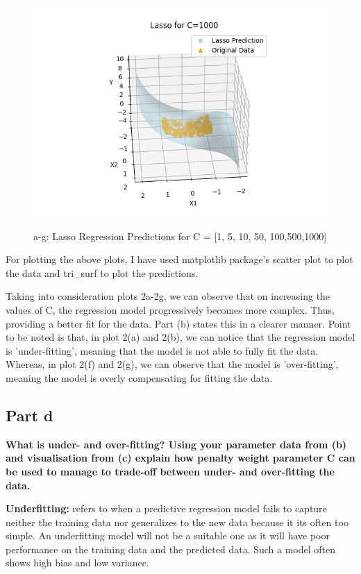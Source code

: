 \documentclass[10pt]{article}
\begin{document}
\begin{figure}[H]
\begin{center}
    \includegraphics[scale=0.4]{./images/Figure_2_1000.png}
    \caption{a-g: Lasso Regression Predictions for C = [1, 5, 10, 50, 100,500,1000]}
  \end{center}
\end{figure}
For plotting the above plots, I have used matplotlib package's scatter plot to plot the data and tri\_surf to plot the predictions.

Taking into consideration plots 2a-2g, we can observe that on increasing the values of C, the regression model progressively becomes more complex. Thus, providing a better fit for the data. Part (b) states this in a clearer manner. Point to be noted is that, in plot 2(a) and 2(b), we can notice that the regression model is 'under-fitting', meaning that the model is not able to fully fit the data. Whereas, in plot 2(f) and 2(g), we can observe that the model is 'over-fitting', meaning the model is overly compensating for fitting the data.

\subsection*{Part d}
\textbf{What is under- and over-fitting? Using your parameter data from (b) and
  visualisation from (c) explain how penalty weight parameter C can be used to
  manage to trade-off between under- and over-fitting the data.}

\textbf{Underfitting:} refers to when a predictive regression model fails to capture
neither the training data nor generalizes to the new data because it its
often too simple. An underfitting model will not be a suitable one as it
will have poor performance on the training data and the predicted data.
Such a model often shows high bias and low variance.
\end{document}
